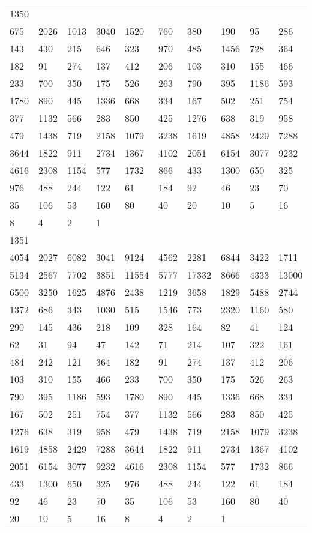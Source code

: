 \begin{longtable}{*{10}{l}}
1350&&&&&&&&&\\
675& 2026& 1013& 3040& 1520& 760& 380& 190& 95& 286\\
143& 430& 215& 646& 323& 970& 485& 1456& 728& 364\\
182& 91& 274& 137& 412& 206& 103& 310& 155& 466\\
233& 700& 350& 175& 526& 263& 790& 395& 1186& 593\\
1780& 890& 445& 1336& 668& 334& 167& 502& 251& 754\\
377& 1132& 566& 283& 850& 425& 1276& 638& 319& 958\\
479& 1438& 719& 2158& 1079& 3238& 1619& 4858& 2429& 7288\\
3644& 1822& 911& 2734& 1367& 4102& 2051& 6154& 3077& 9232\\
4616& 2308& 1154& 577& 1732& 866& 433& 1300& 650& 325\\
976& 488& 244& 122& 61& 184& 92& 46& 23& 70\\
35& 106& 53& 160& 80& 40& 20& 10& 5& 16\\
8& 4& 2& 1& \\

1351&&&&&&&&&\\
4054& 2027& 6082& 3041& 9124& 4562& 2281& 6844& 3422& 1711\\
5134& 2567& 7702& 3851& 11554& 5777& 17332& 8666& 4333& 13000\\
6500& 3250& 1625& 4876& 2438& 1219& 3658& 1829& 5488& 2744\\
1372& 686& 343& 1030& 515& 1546& 773& 2320& 1160& 580\\
290& 145& 436& 218& 109& 328& 164& 82& 41& 124\\
62& 31& 94& 47& 142& 71& 214& 107& 322& 161\\
484& 242& 121& 364& 182& 91& 274& 137& 412& 206\\
103& 310& 155& 466& 233& 700& 350& 175& 526& 263\\
790& 395& 1186& 593& 1780& 890& 445& 1336& 668& 334\\
167& 502& 251& 754& 377& 1132& 566& 283& 850& 425\\
1276& 638& 319& 958& 479& 1438& 719& 2158& 1079& 3238\\
1619& 4858& 2429& 7288& 3644& 1822& 911& 2734& 1367& 4102\\
2051& 6154& 3077& 9232& 4616& 2308& 1154& 577& 1732& 866\\
433& 1300& 650& 325& 976& 488& 244& 122& 61& 184\\
92& 46& 23& 70& 35& 106& 53& 160& 80& 40\\
20& 10& 5& 16& 8& 4& 2& 1& \\


\end{longtable}
